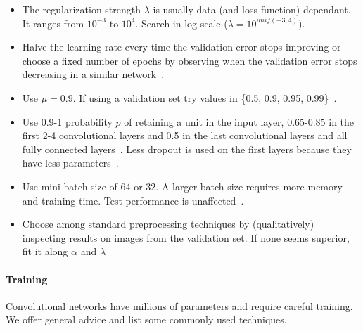 \begin{itemize}
	\item The regularization strength $\lambda$ is usually data (and loss function) dependant. It ranges from $10^{-3}$ to $10^4$. Search in log scale ($\lambda = 10^{unif(-3, 4)}$).
	\item Halve the learning rate every time the validation error stops improving or choose a fixed number of epochs by observing when the validation error stops decreasing in a similar network~\cite{Krizhevsky2012}.

	\item Use $\mu=0.9$. If using a validation set try values in \{0.5, 0.9, 0.95, 0.99\}~\cite{Karpathy2015}.

	\item Use 0.9-1 probability $p$ of retaining a unit in the input layer, 0.65-0.85 in the first 2-4 convolutional layers and 0.5 in the last convolutional layers and all fully connected layers~\cite{Srivastava2014}. Less dropout is used on the first layers because they have less parameters~\cite{Karpathy2015}.

	\item Use mini-batch size of 64 or 32. A larger batch size requires more memory and training time. Test performance is unaffected~\cite{Bengio2012}.

	\item Choose among standard preprocessing techniques by (qualitatively) inspecting results on images from the validation set. If none seems superior, fit it along $\alpha$ and $\lambda$%
\end{itemize}



\paragraph{Training} Convolutional networks have millions of parameters and require careful training. We offer general advice and list some commonly used techniques.


